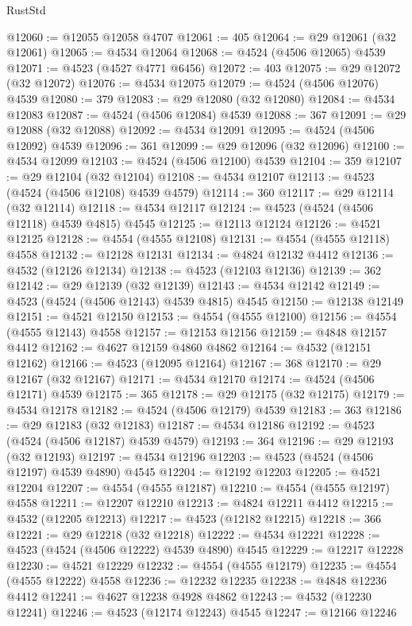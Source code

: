 \begin{lexlean}{RustStd}
\begin{coremodule}
@12060 := @12055 @12058 @4707
@12061 := 405
@12064 := @29 @12061 (@32 @12061)
@12065 := @4534 @12064
@12068 := @4524 (@4506 @12065) @4539
@12071 := @4523 (@4527 @4771 @6456)
@12072 := 403
@12075 := @29 @12072 (@32 @12072)
@12076 := @4534 @12075
@12079 := @4524 (@4506 @12076) @4539
@12080 := 379
@12083 := @29 @12080 (@32 @12080)
@12084 := @4534 @12083
@12087 := @4524 (@4506 @12084) @4539
@12088 := 367
@12091 := @29 @12088 (@32 @12088)
@12092 := @4534 @12091
@12095 := @4524 (@4506 @12092) @4539
@12096 := 361
@12099 := @29 @12096 (@32 @12096)
@12100 := @4534 @12099
@12103 := @4524 (@4506 @12100) @4539
@12104 := 359
@12107 := @29 @12104 (@32 @12104)
@12108 := @4534 @12107
@12113 := @4523 (@4524 (@4506 @12108) @4539 @4579)
@12114 := 360
@12117 := @29 @12114 (@32 @12114)
@12118 := @4534 @12117
@12124 := @4523 (@4524 (@4506 @12118) @4539 @4815) @4545
@12125 := @12113 @12124
@12126 := @4521 @12125
@12128 := @4554 (@4555 @12108)
@12131 := @4554 (@4555 @12118) @4558
@12132 := @12128 @12131
@12134 := @4824 @12132 @4412
@12136 := @4532 (@12126 @12134)
@12138 := @4523 (@12103 @12136)
@12139 := 362
@12142 := @29 @12139 (@32 @12139)
@12143 := @4534 @12142
@12149 := @4523 (@4524 (@4506 @12143) @4539 @4815) @4545
@12150 := @12138 @12149
@12151 := @4521 @12150
@12153 := @4554 (@4555 @12100)
@12156 := @4554 (@4555 @12143) @4558
@12157 := @12153 @12156
@12159 := @4848 @12157 @4412
@12162 := @4627 @12159 @4860 @4862
@12164 := @4532 (@12151 @12162)
@12166 := @4523 (@12095 @12164)
@12167 := 368
@12170 := @29 @12167 (@32 @12167)
@12171 := @4534 @12170
@12174 := @4524 (@4506 @12171) @4539
@12175 := 365
@12178 := @29 @12175 (@32 @12175)
@12179 := @4534 @12178
@12182 := @4524 (@4506 @12179) @4539
@12183 := 363
@12186 := @29 @12183 (@32 @12183)
@12187 := @4534 @12186
@12192 := @4523 (@4524 (@4506 @12187) @4539 @4579)
@12193 := 364
@12196 := @29 @12193 (@32 @12193)
@12197 := @4534 @12196
@12203 := @4523 (@4524 (@4506 @12197) @4539 @4890) @4545
@12204 := @12192 @12203
@12205 := @4521 @12204
@12207 := @4554 (@4555 @12187)
@12210 := @4554 (@4555 @12197) @4558
@12211 := @12207 @12210
@12213 := @4824 @12211 @4412
@12215 := @4532 (@12205 @12213)
@12217 := @4523 (@12182 @12215)
@12218 := 366
@12221 := @29 @12218 (@32 @12218)
@12222 := @4534 @12221
@12228 := @4523 (@4524 (@4506 @12222) @4539 @4890) @4545
@12229 := @12217 @12228
@12230 := @4521 @12229
@12232 := @4554 (@4555 @12179)
@12235 := @4554 (@4555 @12222) @4558
@12236 := @12232 @12235
@12238 := @4848 @12236 @4412
@12241 := @4627 @12238 @4928 @4862
@12243 := @4532 (@12230 @12241)
@12246 := @4523 (@12174 @12243) @4545
@12247 := @12166 @12246

\end{coremodule}
\end{lexlean}
